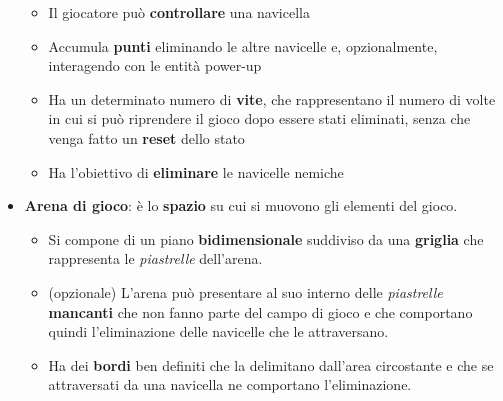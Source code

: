 \begin{itemize}
                    \begin{itemize}
                        \item Il giocatore può \textbf{controllare} una navicella
                        \item Accumula \textbf{punti} eliminando le altre navicelle e, opzionalmente, interagendo con le entità power-up
                        \item Ha un determinato numero di \textbf{vite}, che rappresentano il numero di volte in cui si può riprendere il gioco dopo essere stati eliminati, senza che venga fatto un \textbf{reset} dello stato
                        \item Ha l'obiettivo di \textbf{eliminare} le navicelle nemiche 
                    \end{itemize}
                \item \textbf{Arena di gioco}: è lo \textbf{spazio} su cui si muovono gli elementi del gioco.
                \begin{itemize}
                    \item Si compone di un piano \textbf{bidimensionale} suddiviso da una \textbf{griglia} che rappresenta le \textit{piastrelle} dell'arena.
                    \item (opzionale) L'arena può presentare al suo interno delle \textit{piastrelle} \textbf{mancanti} che non fanno parte del campo di gioco e che comportano quindi l'eliminazione delle navicelle che le attraversano.    
                    \item Ha dei \textbf{bordi} ben definiti che la delimitano dall'area circostante e che se attraversati da una navicella ne comportano l'eliminazione.
                \end{itemize}
            \end{itemize}

